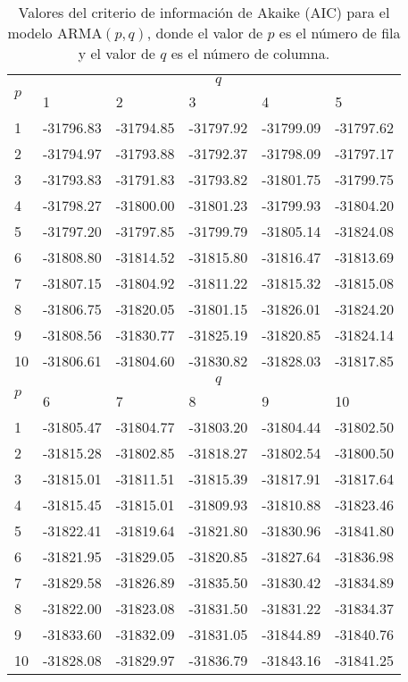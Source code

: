 \documentclass{article}
\begin{document}
\begin{table}[H]
\centering
\begin{tabularx}{0.9\textwidth}{YYYYYY}
\toprule
{} &  \\
& 1 & 2 & 3 & 4 & 5 \\
1 & -31796.83 & -31794.85 & -31797.92 & -31799.09 & -31797.62 \\
2 & -31794.97 & -31793.88 & -31792.37 & -31798.09 & -31797.17 \\
3 & -31793.83 & -31791.83 & -31793.82 & -31801.75 & -31799.75 \\
4 & -31798.27 & -31800.00 & -31801.23 & -31799.93 & -31804.20 \\
5 & -31797.20 & -31797.85 & -31799.79 & -31805.14 & -31824.08 \\
6 & -31808.80 & -31814.52 & -31815.80 & -31816.47 & -31813.69 \\
7 & -31807.15 & -31804.92 & -31811.22 & -31815.32 & -31815.08 \\
8 & -31806.75 & -31820.05 & -31801.15 & -31826.01 & -31824.20 \\
9 & -31808.56 & -31830.77 & -31825.19 & -31820.85 & -31824.14 \\
10 & -31806.61 & -31804.60 & -31830.82 & -31828.03 & -31817.85 \\
\midrule
{} &  \\
& 6 & 7 & 8 & 9 & 10 \\
1 & -31805.47 & -31804.77 & -31803.20 & -31804.44 & -31802.50 \\
2 & -31815.28 & -31802.85 & -31818.27 & -31802.54 & -31800.50 \\
3 & -31815.01 & -31811.51 & -31815.39 & -31817.91 & -31817.64 \\
4 & -31815.45 & -31815.01 & -31809.93 & -31810.88 & -31823.46 \\
5 & -31822.41 & -31819.64 & -31821.80 & -31830.96 & -31841.80 \\
6 & -31821.95 & -31829.05 & -31820.85 & -31827.64 &-31836.98 \\
7 & -31829.58 & -31826.89 & -31835.50 & -31830.42 & -31834.89 \\
8 & -31822.00 & -31823.08 & -31831.50 & -31831.22 & -31834.37 \\
9 & -31833.60 & -31832.09 & -31831.05 & -31844.89 & -31840.76 \\
10 & -31828.08 & -31829.97 & -31836.79 & -31843.16 & -31841.25 \\
\bottomrule
\end{tabularx}
\caption{\label{tab:akaike}Valores del criterio de información de Akaike (AIC) para el modelo $\mathrm{ARMA}(p, q)$, donde el valor de $p$ es el número de fila y el valor de $q$ es el número de columna.}
\end{table}
\end{document}
